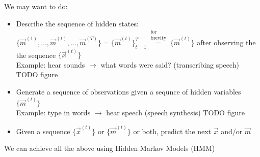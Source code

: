 \begin{frame}

We may want to do:
\begin{itemize}
\item Describe the sequence of hidden states:
$\{ \vec m^{(1)}, \ldots, \vec m^{(t)}, \ldots, \vec m^{(T)}\} = \{ \vec m^{(t)}\}_{t=1}^{T} \stackrel{\substack{\text{for}\\ \text{brevity}}}{=} \{ \vec m^{(t)}\}$
after observing the the sequence $\{\vec x^{(t)}\}$\\
Example: hear sounds $\rightarrow$ what words were said? (transcribing speech)
TODO figure
\item Generate a sequence of observations given a sequnce of hidden variables $\{\vec m^{(t)}\}$
\\
Example: type in words $\rightarrow$ hear speech (speech synthesis)
TODO figure
\item Given a sequence $\{\vec x^{(t)}\}$ or $\{\vec m^{(t)}\}$ or both, predict the next $\vec x$ and/or $\vec m$
\end{itemize}

We can achieve all the above using Hidden Markov Models (HMM)

\end{frame}
